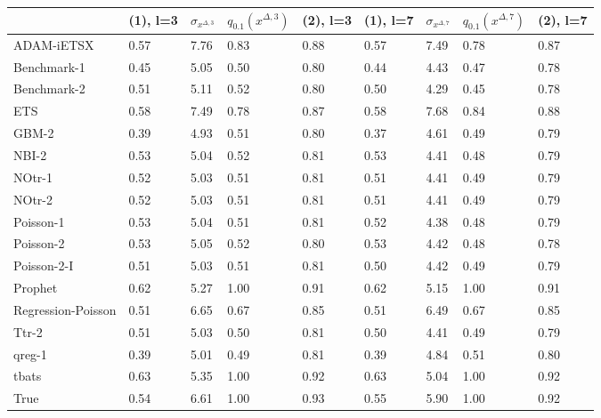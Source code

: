 \begin{tabular}{lllllllll}
\toprule
 & (1), l=3 & $\sigma_{x^{\Delta, 3}}$ & $q_{0.1} (x^{\Delta, 3})$ & (2), l=3 & (1), l=7 & $\sigma_{x^{\Delta, 7}}$ & $q_{0.1} (x^{\Delta, 7})$ & (2), l=7 \\
\midrule
ADAM-iETSX & 0.57 & 7.76 & 0.83 & 0.88 & 0.57 & 7.49 & 0.78 & 0.87 \\
Benchmark-1 & 0.45 & 5.05 & 0.50 & 0.80 & 0.44 & 4.43 & 0.47 & 0.78 \\
Benchmark-2 & 0.51 & 5.11 & 0.52 & 0.80 & 0.50 & 4.29 & 0.45 & 0.78 \\
ETS & 0.58 & 7.49 & 0.78 & 0.87 & 0.58 & 7.68 & 0.84 & 0.88 \\
GBM-2 & 0.39 & 4.93 & 0.51 & 0.80 & 0.37 & 4.61 & 0.49 & 0.79 \\
NBI-2 & 0.53 & 5.04 & 0.52 & 0.81 & 0.53 & 4.41 & 0.48 & 0.79 \\
NOtr-1 & 0.52 & 5.03 & 0.51 & 0.81 & 0.51 & 4.41 & 0.49 & 0.79 \\
NOtr-2 & 0.52 & 5.03 & 0.51 & 0.81 & 0.51 & 4.41 & 0.49 & 0.79 \\
Poisson-1 & 0.53 & 5.04 & 0.51 & 0.81 & 0.52 & 4.38 & 0.48 & 0.79 \\
Poisson-2 & 0.53 & 5.05 & 0.52 & 0.80 & 0.53 & 4.42 & 0.48 & 0.78 \\
Poisson-2-I & 0.51 & 5.03 & 0.51 & 0.81 & 0.50 & 4.42 & 0.49 & 0.79 \\
Prophet & 0.62 & 5.27 & 1.00 & 0.91 & 0.62 & 5.15 & 1.00 & 0.91 \\
Regression-Poisson & 0.51 & 6.65 & 0.67 & 0.85 & 0.51 & 6.49 & 0.67 & 0.85 \\
Ttr-2 & 0.51 & 5.03 & 0.50 & 0.81 & 0.50 & 4.41 & 0.49 & 0.79 \\
qreg-1 & 0.39 & 5.01 & 0.49 & 0.81 & 0.39 & 4.84 & 0.51 & 0.80 \\
tbats & 0.63 & 5.35 & 1.00 & 0.92 & 0.63 & 5.04 & 1.00 & 0.92 \\
True & 0.54 & 6.61 & 1.00 & 0.93 & 0.55 & 5.90 & 1.00 & 0.92 \\
\bottomrule
\end{tabular}
